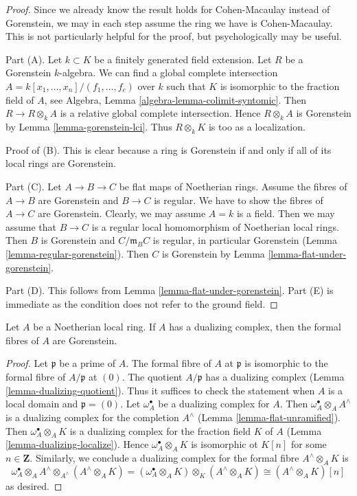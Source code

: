 \begin{proof}
Since we already know the result holds for Cohen-Macaulay instead
of Gorenstein, we may in each step assume the ring we have is
Cohen-Macaulay. This is not particularly helpful for the proof, but
psychologically may be useful.

\medskip\noindent
Part (A). Let $k \subset K$ be a finitely generated field extension.
Let $R$ be a Gorenstein $k$-algebra.
We can find a global complete intersection
$A = k[x_1, \ldots, x_n]/(f_1, \ldots, f_c)$
over $k$ such that $K$ is isomorphic to the fraction field of $A$, see
Algebra, Lemma \ref{algebra-lemma-colimit-syntomic}.
Then $R \to R \otimes_k A$ is a relative global complete intersection.
Hence $R \otimes_k A$ is Gorenstein by Lemma \ref{lemma-gorenstein-lci}.
Thus $R \otimes_k K$ is too as a localization.

\medskip\noindent
Proof of (B). This is clear because a ring is Gorenstein
if and only if all of its local rings are Gorenstein.

\medskip\noindent
Part (C). Let $A \to B \to C$ be flat maps of Noetherian rings.
Assume the fibres of $A \to B$ are Gorenstein and $B \to C$ is regular.
We have to show the fibres of $A \to C$ are Gorenstein.
Clearly, we may assume $A = k$ is a field. Then we may assume that
$B \to C$ is a regular local homomorphism of Noetherian local rings.
Then $B$ is Gorenstein and $C/\mathfrak m_B C$ is regular, in
particular Gorenstein (Lemma \ref{lemma-regular-gorenstein}).
Then $C$ is Gorenstein by
Lemma \ref{lemma-flat-under-gorenstein}.

\medskip\noindent
Part (D). This follows from Lemma \ref{lemma-flat-under-gorenstein}.
Part (E) is immediate as the condition does not refer to the ground field.
\end{proof}

\begin{lemma}
\label{lemma-dualizing-gorenstein-formal-fibres}
Let $A$ be a Noetherian local ring. If $A$ has a dualizing complex,
then the formal fibres of $A$ are Gorenstein.
\end{lemma}

\begin{proof}
Let $\mathfrak p$ be a prime of $A$. The formal fibre of $A$ at $\mathfrak p$
is isomorphic to the formal fibre of $A/\mathfrak p$ at $(0)$. The quotient
$A/\mathfrak p$ has a dualizing complex
(Lemma \ref{lemma-dualizing-quotient}).
Thus it suffices to check the statement
when $A$ is a local domain and $\mathfrak p = (0)$.
Let $\omega_A^\bullet$ be a dualizing complex for $A$. Then
$\omega_A^\bullet \otimes_A A^\wedge$ is a dualizing complex
for the completion $A^\wedge$
(Lemma \ref{lemma-flat-unramified}).
Then $\omega_A^\bullet \otimes_A K$ is a dualizing
complex for the fraction field $K$ of $A$
(Lemma \ref{lemma-dualizing-localize}).
Hence $\omega_A^\bullet \otimes_A K$
is isomorphic ot $K[n]$ for some $n \in \mathbf{Z}$.
Similarly, we conclude a dualizing complex for the formal fibre
$A^\wedge \otimes_A K$ is
$$
\omega_A^\bullet \otimes_A A^\wedge \otimes_{A^\wedge} (A^\wedge \otimes_A K) =
(\omega_A^\bullet \otimes_A K) \otimes_K (A^\wedge \otimes_A K) \cong
(A^\wedge \otimes_A K)[n]
$$
as desired.
\end{proof}


